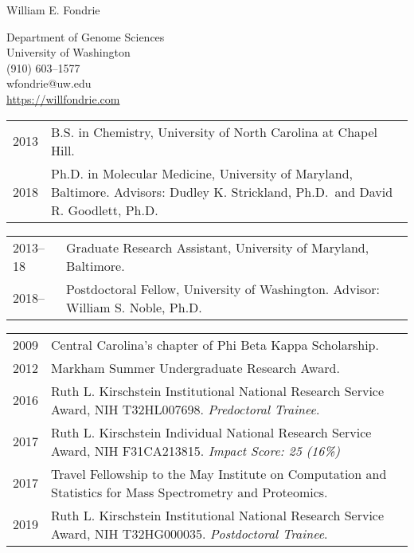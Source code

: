 \documentclass{article}
\newcommand{\mysection}[1]{\vspace{1ex}{\bf #1}}
\begin{document}
\begin{center}
  {\Large William E. Fondrie}

  Department of Genome Sciences\\
  University of Washington\\
  (910) 603--1577\\
  wfondrie@uw.edu \\
  \url{https://willfondrie.com}\\
\end{center}

\mysection{Education}

\begin{tabular}{p{0.5in}p{5.75in}}
  2013 & B.S. in Chemistry, University of North Carolina at Chapel Hill.\\
  2018 & Ph.D. in Molecular Medicine, University of Maryland, Baltimore.
         \newline Advisors: Dudley K. Strickland, Ph.D.\
         and David R. Goodlett, Ph.D.\\
\end{tabular}

\mysection{Employment and Professional Appointments}

\begin{tabular}{p{0.5in}p{5.75in}}
  2013--18 & Graduate Research Assistant, University of Maryland,
             Baltimore.\\
  2018--   & Postdoctoral Fellow, University of Washington.
             \newline Advisor: William S. Noble, Ph.D.\\
\end{tabular}

\mysection{Awards}

\begin{tabular}{p{0.5in}p{5.75in}}
  2009 & Central Carolina's chapter of Phi Beta Kappa Scholarship.\\
  2012 & Markham Summer Undergraduate Research Award.\\
  2016 & Ruth L. Kirschstein Institutional National Research Service Award,
         NIH T32HL007698.
         \newline \textit{Predoctoral Trainee}.\\
  2017 & Ruth L. Kirschstein Individual National Research Service Award,
         NIH F31CA213815.
         \newline \textit{Impact Score: 25 (16\%)}\\
  2017 & Travel Fellowship to the May Institute on Computation and Statistics
         for Mass Spectrometry and Proteomics.\\
  2019 & Ruth L. Kirschstein Institutional National Research Service Award,
         NIH T32HG000035.
         \newline \textit{Postdoctoral Trainee}.\\
	
\end{tabular}
\end{document}
